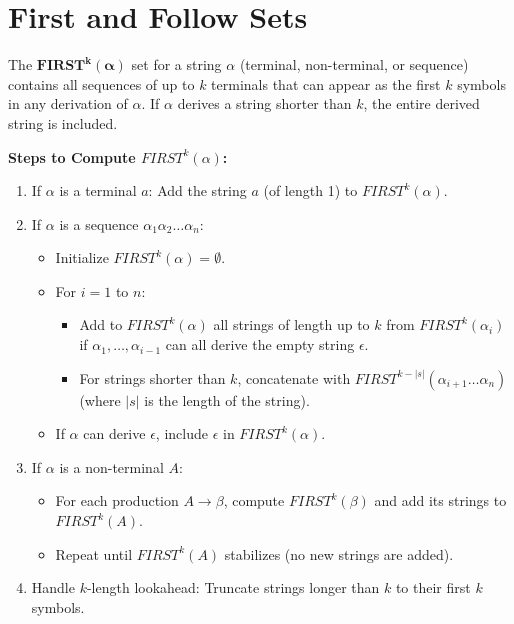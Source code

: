 \section{First and Follow Sets}

The $\mathbf{FIRST^k(\alpha)}$ set for a string $\alpha$ (terminal, non-terminal, or sequence) contains all sequences of up to $k$ terminals that can appear as the first $k$ symbols in any derivation of $\alpha$. If $\alpha$ derives a string shorter than $k$, the entire derived string is included.

\textbf{Steps to Compute $FIRST^k(\alpha)$:}
\begin{enumerate}
    \item If $\alpha$ is a terminal $a$: Add the string $a$ (of length 1) to $FIRST^k(\alpha)$.
    
    \item If $\alpha$ is a sequence $\alpha_1 \alpha_2 \dots \alpha_n$:
    \begin{itemize}
        \item Initialize $FIRST^k(\alpha) = \emptyset$.
        \item For $i = 1$ to $n$:
        \begin{itemize}
            \item Add to $FIRST^k(\alpha)$ all strings of length up to $k$ from $FIRST^k(\alpha_i)$ if $\alpha_1, \dots, \alpha_{i-1}$ can all derive the empty string $\epsilon$.
            \item For strings shorter than $k$, concatenate with $FIRST^{k-|s|}(\alpha_{i+1} \dots \alpha_n)$ (where $|s|$ is the length of the string).
        \end{itemize}
        \item If $\alpha$ can derive $\epsilon$, include $\epsilon$ in $FIRST^k(\alpha)$.
    \end{itemize}
    
    \item If $\alpha$ is a non-terminal $A$:
    \begin{itemize}
        \item For each production $A \to \beta$, compute $FIRST^k(\beta)$ and add its strings to $FIRST^k(A)$.
        \item Repeat until $FIRST^k(A)$ stabilizes (no new strings are added).
    \end{itemize}
    
    \item Handle $k$-length lookahead: Truncate strings longer than $k$ to their first $k$ symbols.
\end{enumerate}

